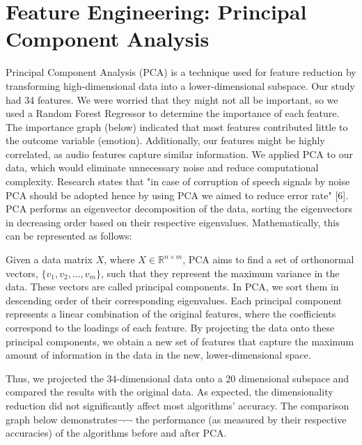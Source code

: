 \documentclass[conference]{IEEEtran}
\begin{document}
\section{Feature Engineering: Principal Component Analysis}
Principal Component Analysis (PCA) is a technique used for feature reduction by transforming high-dimensional data into a lower-dimensional subspace. Our study had 34 features. We were worried that they might not all be important, so we used a Random Forest Regressor to determine the importance of each feature. The importance graph (below) indicated that most features contributed little to the outcome variable (emotion). Additionally, our features might be highly correlated, as audio features capture similar information.
We applied PCA to our data, which would eliminate unnecessary noise and reduce computational complexity. Research states that "in case of corruption of speech signals by noise PCA should be adopted hence by using PCA we aimed to reduce error rate" [6]. PCA performs an eigenvector decomposition of the data, sorting the eigenvectors in decreasing order based on their respective eigenvalues. Mathematically, this can be represented as follows:

Given a data matrix $X$, where $X \in \mathbb{R}^{n \times m}$, PCA aims to find a set of orthonormal vectors, $\{v_1, v_2, ..., v_m\}$, such that they represent the maximum variance in the data. These vectors are called principal components. In PCA, we sort them in descending order of their corresponding eigenvalues. Each principal component represents a linear combination of the original features, where the coefficients correspond to the loadings of each feature. By projecting the data onto these principal components, we obtain a new set of features that capture the maximum amount of information in the data in the new, lower-dimensional space.

Thus, we projected the 34-dimensional data onto a 20 dimensional subspace and compared the results with the original data. As expected, the dimensionality reduction did not significantly affect most algorithms’ accuracy. The comparison graph below demonstrates¬¬ the performance (as measured by their respective accuracies) of the algorithms before and after PCA.
\end{document}
